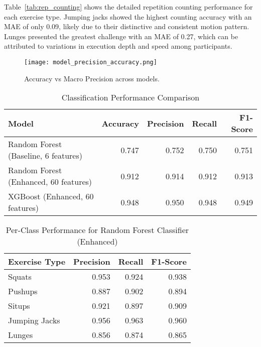 \documentclass[conference]{IEEEtran}
\begin{document}
Table~\ref{tab:rep_counting} shows the detailed repetition counting performance for each exercise type. Jumping jacks showed the highest counting accuracy with an MAE of only 0.09, likely due to their distinctive and consistent motion pattern. Lunges presented the greatest challenge with an MAE of 0.27, which can be attributed to variations in execution depth and speed among participants.

\begin{figure}[t]
  \centering
  \texttt{[image: model\_precision\_accuracy.png]}
  \caption{Accuracy vs Macro Precision across models.}
  \label{fig:accuracy_precision}
\end{figure}

\begin{table}[t]
  \centering
  \caption{Classification Performance Comparison}
  \label{tab:overall}
  \begin{adjustbox}{max width=\linewidth}
  \begin{tabular}{lrrrr}
  \toprule
  \textbf{Model} & \textbf{Accuracy} & \textbf{Precision} & \textbf{Recall} & \textbf{F1-Score} \\
  \midrule
  Random Forest (Baseline, 6 features) & 0.747 & 0.752 & 0.750 & 0.751 \\
  Random Forest (Enhanced, 60 features) & 0.912 & 0.914 & 0.912 & 0.913 \\
  XGBoost (Enhanced, 60 features) & 0.948 & 0.950 & 0.948 & 0.949 \\
  \bottomrule
  \end{tabular}
  \end{adjustbox}
\end{table}

\begin{table}[t]
  \centering
  \caption{Per-Class Performance for Random Forest Classifier (Enhanced)}
  \label{tab:perclass}
  \begin{adjustbox}{max width=\linewidth}
  \begin{tabular}{lrrr}
  \toprule
  \textbf{Exercise Type} & \textbf{Precision} & \textbf{Recall} & \textbf{F1-Score} \\
  \midrule
  Squats & 0.953 & 0.924 & 0.938 \\
  Pushups & 0.887 & 0.902 & 0.894 \\
  Situps & 0.921 & 0.897 & 0.909 \\
  Jumping Jacks & 0.956 & 0.963 & 0.960 \\
  Lunges & 0.856 & 0.874 & 0.865 \\
  \bottomrule
  \end{tabular}
  \end{adjustbox}
\end{table}
\end{document}

